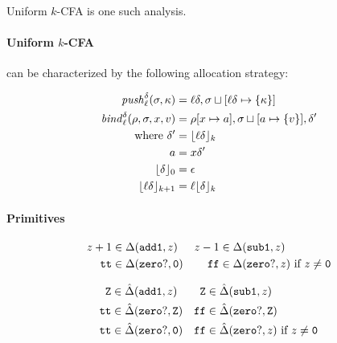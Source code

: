 \documentclass[preprint,onecolumn,9pt]{sigplanconf} %
\begin{document}
Uniform \(k\)-CFA is one such analysis.

\paragraph{Uniform \(k\)-CFA} can be characterized by the following allocation
strategy:

\begin{align*}
\mathit{push}_{\ell}^{\delta}(\sigma,\kappa) &=
  {\ell}{\delta},\sigma\sqcup[{\ell}{\delta}\mapsto\{\kappa\}] \\
\mathit{bind}^{\delta}_{\ell}(\rho,\sigma,x,v) &= \rho[x \mapsto a],
                                           \sigma\sqcup[a \mapsto
                                             \{ v\}],
                                           {\delta}' \\
\mbox{where } {\delta}' &= \lfloor{\ell}{\delta}\rfloor_k \\
              a &= x{\delta}' \\
              \lfloor {\delta} \rfloor_0 &= {\epsilon} \\
              \lfloor {\ell}{\delta} \rfloor_{k+1} &= {\ell}\lfloor {\delta}\rfloor_k
\end{align*}

\paragraph{Primitives}

\begin{align*}
z+1 &\in \Delta({\tt add1},z) &
z-1 &\in \Delta({\tt sub1},z)\\
{\tt tt} &\in \Delta({\tt zero?},{\tt 0}) &
{\tt ff} &\in \Delta({\tt zero?},z)\text{ if }z\neq {\tt 0}\\
\end{align*}

\begin{align*}
{\tt Z} &\in \hat{\Delta}({\tt add1},z) &
{\tt Z} &\in \hat{\Delta}({\tt sub1},z)\\
{\tt tt} &\in \hat{\Delta}({\tt zero?},{\tt Z}) &
{\tt ff} &\in \hat{\Delta}({\tt zero?},{\tt Z})\\
{\tt tt} &\in \hat{\Delta}({\tt zero?},{\tt 0}) &
{\tt ff} &\in \hat{\Delta}({\tt zero?},z)\text{ if }z\neq {\tt 0}\\
\end{align*}
\end{document}
